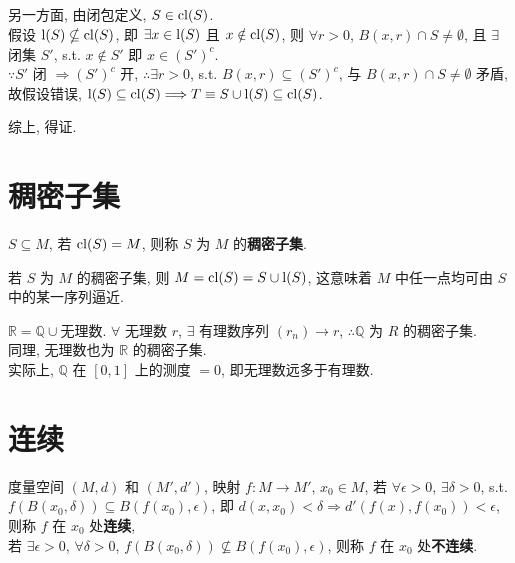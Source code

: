 \documentclass{note}
\begin{document}
\begin{pf}
\begin{itemize}
        另一方面, 由闭包定义, $S\in\operatorname{cl}(S)$.\\
        假设 $\operatorname{l}(S)\nsubseteq\operatorname{cl}(S)$, 即 $\exists x\in\operatorname{l}(S)$ 且 $x\notin\operatorname{cl}(S)$, 则 $\forall r>0$, $B(x,r)\cap S\neq\emptyset$, 且 $\exists$ 闭集 $S'$, s.t. $x\notin S'$ 即 $x\in(S')^c$.\\
        $\because S'$ 闭 $\Longrightarrow(S')^c$ 开, $\therefore\exists r>0$, s.t. $B(x,r)\subseteq(S')^c$, 与 $B(x,r)\cap S\neq\emptyset$ 矛盾, 故假设错误, $\operatorname{l}(S)\subseteq\operatorname{cl}(S)\Longrightarrow T\equiv S\cup\operatorname{l}(S)\subseteq\operatorname{cl}(S)$.

        综上, 得证.
    \end{itemize}
\end{pf}

\section{稠密子集}
\begin{df}[稠密子集]
    $S\subseteq M$, 若 $\operatorname{cl}(S)=M$, 则称 $S$ 为 $M$ 的\textbf{稠密子集}.
\end{df}

若 $S$ 为 $M$ 的稠密子集, 则 $M=\operatorname{cl}(S)=S\cup\operatorname{l}(S)$, 这意味着 $M$ 中任一点均可由 $S$ 中的某一序列逼近.

\begin{eg}
    $\mathbb{R}=\mathbb{Q}\cup$无理数. $\forall$ 无理数 $r$, $\exists$ 有理数序列 $(r_n)\rightarrow r$, $\therefore\mathbb{Q}$ 为 $R$ 的稠密子集.\\
    同理, 无理数也为 $\mathbb{R}$ 的稠密子集.\\
    实际上, $\mathbb{Q}$ 在 $[0,1]$ 上的测度 $=0$, 即无理数远多于有理数.
\end{eg}

\section{连续}
\begin{df}[连续和不连续]
    度量空间 $(M,d)$ 和 $(M',d')$, 映射 $f:M\rightarrow M'$, $x_0\in M$, 若 $\forall\epsilon>0$, $\exists\delta>0$, s.t. $f(B(x_0,\delta))\subseteq B(f(x_0),\epsilon)$, 即 $d(x,x_0)<\delta\Longrightarrow d'(f(x),f(x_0))<\epsilon$, 则称 $f$ 在 $x_0$ 处\textbf{连续},\\
    若 $\exists\epsilon>0$, $\forall\delta>0$, $f(B(x_0,\delta))\nsubseteq B(f(x_0),\epsilon)$, 则称 $f$ 在 $x_0$ 处\textbf{不连续}.
\end{df}
\end{document}
